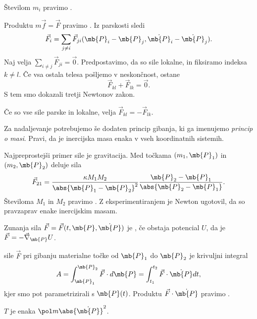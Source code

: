 \begin{opomba}
  Številom $m_i$ pravimo .
\end{opomba}


Produktu $m \vec{f} = \vec{F}$ pravimo .
Iz parskosti sledi
\[
  \vec{F}_i = \sum_{j \ne i} \vec{F}_{ji}(\mb{P}_i - \mb{P}_j, \dot{\mb{P}}_i -
  \dot{\mb{P}}_j).
\]
Naj velja $\sum_{i \ne j} \vec{F}_{ji} = \vec{0}$.
Predpostavimo, da so sile lokalne, in fiksiramo indeksa $k \ne l$.
Če vsa ostala telesa pošljemo v neskončnost, ostane
\[
  \vec{F}_{kl} + \vec{F}_{lk} = \vec{0}.
\]
S tem smo dokazali tretji Newtonov zakon.

\begin{trditev}
  Če so vse sile parske in lokalne, velja $\vec{F}_{kl} = - \vec{F}_{lk}$.
\end{trditev}

Za nadaljevanje potrebujemo še dodaten princip gibanja, ki ga imenujemo
\emph{princip o masi}.
Pravi, da je inercijska masa enaka v vseh koordinatnih sistemih.


Najpreprostejši primer sile je gravitacija.
Med točkama $(m_1, \mb{P}_1)$ in $(m_2, \mb{P}_2)$ deluje sila
\[
  \vec{F}_{21} =  \frac{\kappa M_1 M_2}{\abs{\mb{P}_1 - \mb{P}_2}^2}
  \frac{\mb{P}_2 - \mb{P}_1}{\abs{\mb{P}_2 - \mb{P}_1}}.
\]
Številoma $M_1$ in $M_2$ pravimo .
Z eksperimentiranjem je Newton ugotovil, da so pravzaprav enake inercijskim
masam.

\begin{definicija}
  Zunanja sila $\vec{F} = \vec{F}(t, \mb{P}, \dot{\mb{P}})$ je
  , če obstaja potencial $U$, da je $\vec{F} = -
  \vec{\nabla}_{\mb{P}} U$.
\end{definicija}

\begin{definicija}
   sile $\vec{F}$ pri gibanju materialne točke od $\mb{P}_1$ do
  $\mb{P}_2$ je krivuljni integral
  \[
	A = \int_{\mb{P}_1}^{\mb{P}_2} \vec{F} \cdot d\mb{P}
	= \int_{t_1}^{t_2} \vec{F} \cdot \dot{\mb{P}} dt,
  \]
  kjer smo pot parametrizirali s $\mb{P}(t)$.
  Produktu $\vec{F} \cdot \dot{\mb{P}}$ pravimo .
\end{definicija}

\begin{definicija}
   $T$ je enaka $\pol m \abs{\dot{\mb{P}}}^2$.
\end{definicija}

